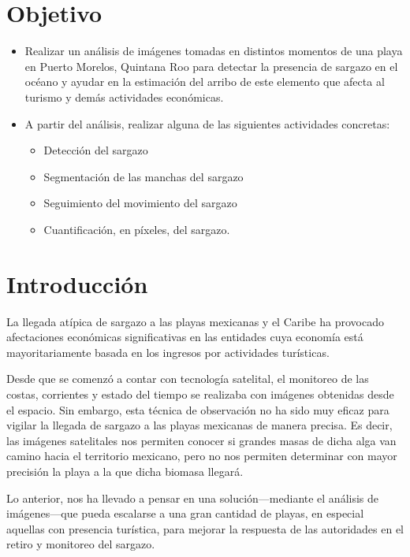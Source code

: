 \documentclass[conference]{IEEEtran}
\begin{document}
\section{Objetivo}
\begin{itemize}
    \item Realizar un análisis de imágenes tomadas en distintos momentos de una playa en Puerto Morelos, Quintana Roo para detectar la presencia de sargazo en el océano y ayudar en la estimación del arribo de este elemento que afecta al turismo y demás actividades económicas.
    \item A partir del análisis, realizar alguna de las siguientes actividades concretas:
    \begin{itemize}
        \item Detección del sargazo
        \item Segmentación de las manchas del sargazo
        \item Seguimiento del movimiento del sargazo
        \item Cuantificación, en píxeles, del sargazo.
    \end{itemize}
\end{itemize}

\section{Introducción}

La llegada atípica de sargazo a las playas mexicanas y el Caribe ha provocado afectaciones económicas significativas en las entidades cuya economía está mayoritariamente basada en los ingresos por actividades turísticas.

Desde que se comenzó a contar con tecnología satelital, el monitoreo de las costas, corrientes y estado del tiempo se realizaba con imágenes obtenidas desde el espacio. Sin embargo, esta técnica de observación no ha sido muy eficaz para vigilar la llegada de sargazo a las playas mexicanas de manera precisa. Es decir, las imágenes satelitales nos permiten conocer si grandes masas de dicha alga van camino hacia el territorio mexicano, pero no nos permiten determinar con mayor precisión la playa a la que dicha biomasa llegará.

Lo anterior, nos ha llevado a pensar en una solución---mediante el análisis de imágenes---que pueda escalarse a una gran cantidad de playas, en especial aquellas con presencia turística, para mejorar la respuesta de las autoridades en el retiro y monitoreo del sargazo.
\end{document}
